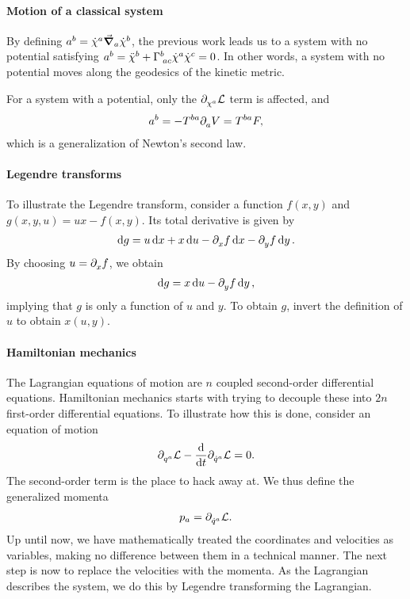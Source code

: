 \paragraph{Motion of a classical system}
By defining $a^{b} = \dot{\chi}^{a}\grad_{a}{\dot{\chi}^{b}}$, the previous work leads us to a system with no potential satisfying $a^{b} = \ddot{\chi}^{b} + \Gamma^{b}_{\;ac}\dot{\chi}^{a}\dot{\chi}^{c} = 0$. In other words, a system with no potential moves along the geodesics of the kinetic metric.

For a system with a potential, only the $\partial^{}_{\chi^{a}}\mathcal{L}$ term is affected, and
\begin{align*}
	a^{b} = - T^{ba}\partial^{}_{a}V = T^{ba}F,
\end{align*}
which is a generalization of Newton's second law.

\paragraph{Legendre transforms}
To illustrate the Legendre transform, consider a function $f(x, y)$ and $g(x, y, u) = ux - f(x, y)$. Its total derivative is given by
\begin{align*}
	\dd{g} = u\dd{x} + x\dd{u} - \partial^{}_{x}f\dd{x} - \partial^{}_{y}f\dd{y}.
\end{align*}
By choosing $u = \partial^{}_{x}f$, we obtain
\begin{align*}
	\dd{g} = x\dd{u} - \partial^{}_{y}f\dd{y},
\end{align*}
implying that $g$ is only a function of $u$ and $y$. To obtain $g$, invert the definition of $u$ to obtain $x(u, y)$.

\paragraph{Hamiltonian mechanics}
The Lagrangian equations of motion are $n$ coupled second-order differential equations. Hamiltonian mechanics starts with trying to decouple these into $2n$ first-order differential equations. To illustrate how this is done, consider an equation of motion
\begin{align*}
	\partial^{}_{q^{a}}\mathcal{L} - \dv{t}\partial^{}_{\dot{q}^{a}}\mathcal{L} = 0.
\end{align*}
The second-order term is the place to hack away at. We thus define the generalized momenta
\begin{align*}
	p_{a} = \partial^{}_{\dot{q}^{a}}\mathcal{L}.
\end{align*}
Up until now, we have mathematically treated the coordinates and velocities as variables, making no difference between them in a technical manner. The next step is now to replace the velocities with the momenta. As the Lagrangian describes the system, we do this by Legendre transforming the Lagrangian.

